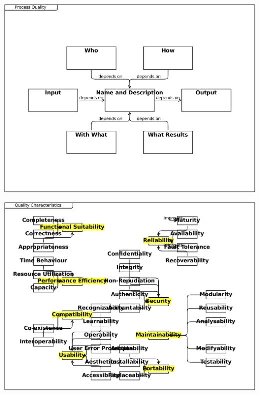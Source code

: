 \documentclass{article}
\begin{document}
\includegraphics[width= 1.0\linewidth]{quality_export/3_Process_Quality.pdf}
\begin{alltt}

\end{alltt}

\includegraphics[width= 1.0\linewidth]{quality_export/4_Quality_Characteristics.pdf}
\begin{alltt}

\end{alltt}
\end{document}
